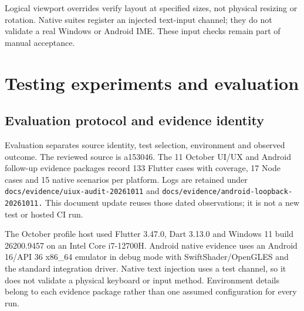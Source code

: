 \documentclass[12pt,a4paper,oneside]{report}
\begin{document}
Logical viewport overrides verify layout at specified sizes, not physical resizing or rotation. Native suites register an injected text-input channel; they do not validate a real Windows or Android IME. These input checks remain part of manual acceptance.

\chapter{Testing experiments and evaluation}
\section{Evaluation protocol and evidence identity}
Evaluation separates source identity, test selection, environment and observed outcome. The reviewed source is a153046. The 11 October UI/UX and Android follow-up evidence packages record 133 Flutter cases with coverage, 17 Node cases and 15 native scenarios per platform. Logs are retained under \nolinkurl{docs/evidence/uiux-audit-20261011} and \nolinkurl{docs/evidence/android-loopback-20261011.} This document update reuses those dated observations; it is not a new test or hosted CI run.

The October profile host used Flutter 3.47.0, Dart 3.13.0 and Windows 11 build 26200.9457 on an Intel Core i7-12700H. Android native evidence uses an Android 16/API 36 x86\_64 emulator in debug mode with SwiftShader/OpenGLES and the standard integration driver. Native text injection uses a test channel, so it does not validate a physical keyboard or input method. Environment details belong to each evidence package rather than one assumed configuration for every run.
\end{document}
